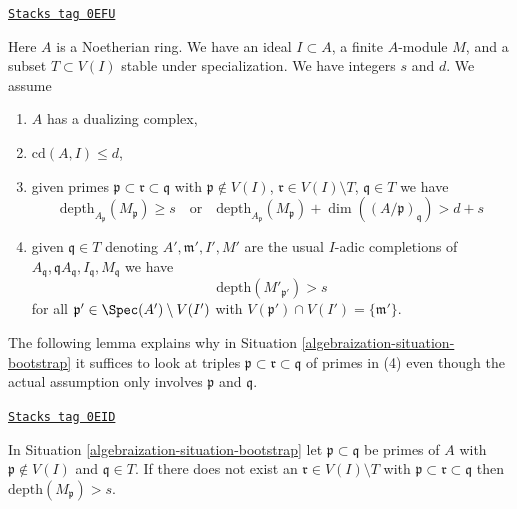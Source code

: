 \begin{definition}
\label{algebraization-situation-bootstrap}
\href{https://stacks.math.columbia.edu/tag/0EFU}{\texttt{Stacks tag 0EFU}}

Here $A$ is a Noetherian ring. We have an ideal $I \subset A$,
a finite $A$-module $M$, and a subset $T \subset V(I)$ stable under
specialization. We have integers $s$ and $d$. We assume
\begin{enumerate}
\item[(1)] $A$ has a dualizing complex,
\item[(3)] $\text{cd}(A, I) \leq d$,
\item[(4)] given primes $\mathfrak p \subset \mathfrak r \subset \mathfrak q$
with $\mathfrak p \not \in V(I)$,
$\mathfrak r \in V(I) \setminus T$,
$\mathfrak q \in T$ we have
$$
\text{depth}_{A_\mathfrak p}(M_\mathfrak p) \geq s
\quad\text{or}\quad
\text{depth}_{A_\mathfrak p}(M_\mathfrak p) +
\dim((A/\mathfrak p)_\mathfrak q) > d + s
$$
\item[(6)] given $\mathfrak q \in T$ denoting
$A', \mathfrak m', I', M'$ are the usual $I$-adic completions
of $A_\mathfrak q, \mathfrak qA_\mathfrak q, I_\mathfrak q, M_\mathfrak q$
we have
$$
\text{depth}(M'_{\mathfrak p'}) > s
$$
for all $\mathfrak p' \in \Spec(A') \setminus V(I')$ with
$V(\mathfrak p') \cap V(I') = \{\mathfrak m'\}$.
\end{enumerate}
\end{definition}

The following lemma explains why in Situation \ref{algebraization-situation-bootstrap}
it suffices to look at triples
$\mathfrak p \subset \mathfrak r \subset \mathfrak q$ of primes in (4)
even though the actual assumption only involves $\mathfrak p$ and $\mathfrak q$.

\begin{lemma}
\label{algebraization-lemma-helper-bootstrap}
\href{https://stacks.math.columbia.edu/tag/0EID}{\texttt{Stacks tag 0EID}}

In Situation \ref{algebraization-situation-bootstrap} let $\mathfrak p \subset \mathfrak q$
be primes of $A$ with $\mathfrak p \not \in V(I)$ and
$\mathfrak q \in T$. If there does not exist an
$\mathfrak r \in V(I) \setminus T$ with
$\mathfrak p \subset \mathfrak r \subset \mathfrak q$
then $\text{depth}(M_\mathfrak p) > s$.
\end{lemma}

